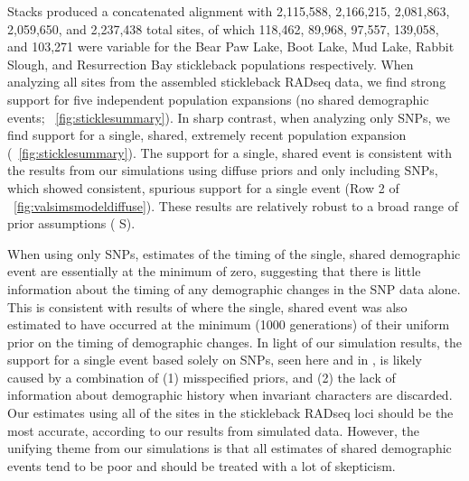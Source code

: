 Stacks produced a concatenated alignment with
2,115,588,
2,166,215,
2,081,863,
2,059,650, and
2,237,438
total sites, of which
118,462,
89,968,
97,557,
139,058, and
103,271
were variable for the Bear Paw Lake, Boot Lake, Mud Lake, Rabbit Slough, and
Resurrection Bay stickleback populations respectively.
When analyzing all sites from the assembled stickleback
RADseq data, we find strong support for five independent
population expansions (no shared demographic events;
\fig{}~\ref{fig:sticklesummary}).
In sharp contrast, when analyzing only SNPs, we find
support for a single, shared, extremely recent population expansion
(\fig{}~\ref{fig:sticklesummary}).
The support for a single, shared event is consistent with the results from our
simulations using diffuse priors and only including SNPs, which showed
consistent, spurious support for a single event
(Row 2 of \fig{}~\ref{fig:valsimsmodeldiffuse}).
These results are relatively robust to a broad range of prior
assumptions
(\figs
S).

\ifembed{

}{}

When using only SNPs, estimates of the timing of the single, shared demographic
event are essentially at the minimum of zero, suggesting that there is little
information about the timing of any demographic changes in the SNP data alone.
This is consistent with results of \citet{Xue2015} where the single, shared
event was also estimated to have occurred at the minimum (1000 generations) of
their uniform prior on the timing of demographic changes.
In light of our simulation results, the support for a single event based solely
on SNPs, seen here and in \citet{Xue2015}, is likely caused by a combination of
(1) misspecified priors, and
(2) the lack of information about demographic history when invariant characters
are discarded.
Our estimates using all of the sites in the stickleback RADseq loci should be
the most accurate, according to our results from simulated data.
However, the unifying theme from our simulations is that all estimates of
shared demographic events tend to be poor and should be treated with a lot of
skepticism.
